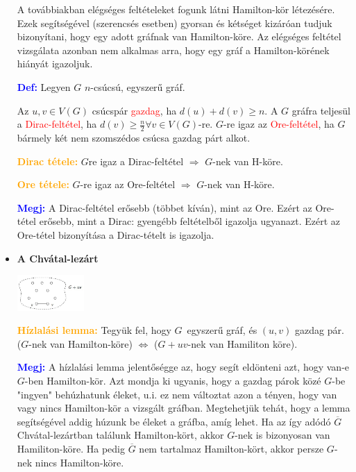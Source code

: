 \documentclass[../../szobeli.tex]{subfiles}
\begin{document}
\begin{itemize}
        A továbbiakban elégséges feltételeket fogunk látni Hamilton-kör létezésére. Ezek segítségével (szerencsés esetben) gyorsan és kétséget kizáróan tudjuk bizonyítani, hogy egy adott gráfnak van Hamilton-köre. Az elégséges feltétel vizsgálata azonban nem alkalmas arra, hogy egy gráf a Hamilton-körének hiányát igazoljuk.

        \textcolor{blue}{\textbf{Def:}} Legyen $G$ $n$-csúcsú, egyszerű gráf.

        Az $u,v \in V(G)$ csúcspár \textcolor{red}{gazdag}, ha $d(u) + d(v) \geq n$. A $G$ gráfra teljesül a \textcolor{red}{Dirac-feltétel}, ha $d(v) \geq \frac{n}{2} \forall v \in V(G)$-re. $G$-re igaz az \textcolor{red}{Ore-feltétel}, ha $G$ bármely két nem szomszédos csúcsa gazdag párt alkot.

        \textcolor{orange}{\textbf{Dirac tétele:}} $G$re igaz a Dirac-feltétel $\Rightarrow$ $G$-nek van H-köre.

        \textcolor{orange}{\textbf{Ore tétele:}} $G$-re igaz az Ore-feltétel $\Rightarrow$ $G$-nek van H-köre.

        \textcolor{blue}{\textbf{Megj:}} A Dirac-feltétel erősebb (többet kíván), mint az Ore. Ezért az Ore-tétel erősebb, mint a Dirac: gyengébb feltételből igazolja ugyanazt. Ezért az Ore-tétel bizonyítása a Dirac-tételt is igazolja.

        \item \textbf{A Chvátal-lezárt} 

        \includegraphics[width=0.2\textwidth]{./img/7.png}

        \textcolor{orange}{\textbf{Hízlalási lemma:}} Tegyük fel, hogy $G$ egyszerű gráf, és $(u,v)$ gazdag pár. ($G$-nek van Hamilton-köre) $\Longleftrightarrow$ ($G + uv$-nek van Hamiliton köre).

        \textcolor{blue}{\textbf{Megj:}} A hízlalási lemma jelentőségge az, hogy segít eldönteni azt, hogy van-e $G$-ben Hamilton-kör. Azt mondja ki ugyanis, hogy a gazdag párok közé $G$-be "ingyen" behúzhatunk éleket, u.i. ez nem változtat azon a tényen, hogy van vagy nincs Hamilton-kör a vizsgált gráfban. Megtehetjük tehát, hogy a lemma segítségével addig húzunk be éleket a gráfba, amíg lehet. Ha az így adódó $\overline{G}$ Chvátal-lezártban találunk Hamilton-kört, akkor $G$-nek is bizonyosan van Hamiliton-köre. Ha pedig $\overline{G}$ nem tartalmaz Hamilton-kört, akkor persze $G$-nek nincs Hamilton-köre.


\end{itemize}
\end{document}
